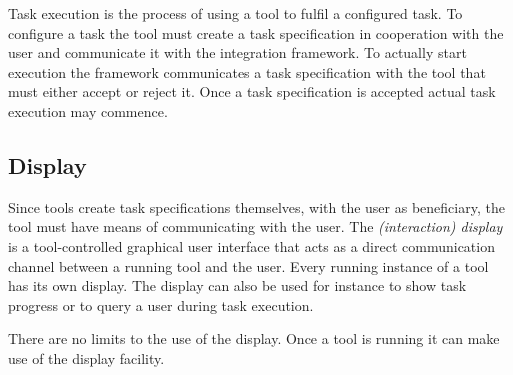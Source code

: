\documentclass{article}
\begin{document}
   Task execution is the process of using a tool to fulfil a configured task.
   To configure a task the tool must create a task specification in cooperation
   with the user and communicate it with the integration framework. To actually
   start execution the framework communicates a task specification with the
   tool that must either accept or reject it. Once a task specification is
   accepted actual task execution may commence.



  \subsection{Display}

   Since tools create task specifications themselves, with the user as
   beneficiary, the tool must have means of communicating with the user. The
   \textit{(interaction) display} is a tool-controlled graphical user interface
   that acts as a direct communication channel between a running tool and the
   user. Every running instance of a tool has its own display. The display can
   also be used for instance to show task progress or to query a user during
   task execution.

   There are no limits to the use of the display. Once a tool is running it can
   make use of the display facility.

\end{document}
